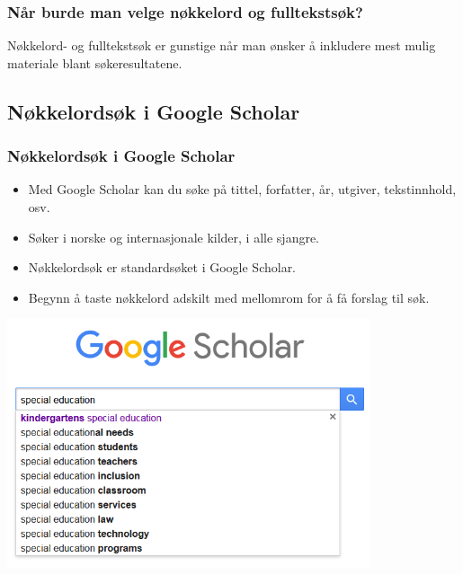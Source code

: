 \documentclass{beamer}
\begin{document}
\begin{frame}
  \frametitle{Når burde man velge nøkkelord og fulltekstsøk?}
  Nøkkelord- og fulltekstsøk er gunstige når man ønsker å inkludere mest mulig materiale blant søkeresultatene.
\end{frame}

\subsection{Nøkkelordsøk i Google Scholar}
\begin{frame}
  \frametitle{Nøkkelordsøk i Google Scholar}
  \begin{itemize}
  \item Med Google Scholar kan du søke på tittel, forfatter, år, utgiver, tekstinnhold, osv.
  \item Søker i norske og internasjonale kilder, i alle sjangre.
  \end{itemize}
\end{frame}

\begin{frame}
  \begin{itemize}
  \item Nøkkelordsøk er standardsøket i Google Scholar.
  \item Begynn å taste nøkkelord adskilt med mellomrom for å få forslag til søk.
  \end{itemize}

  \centering
  \includegraphics[width=0.8\textwidth]{../media/google-scholar.png}
\end{frame}
\end{document}
